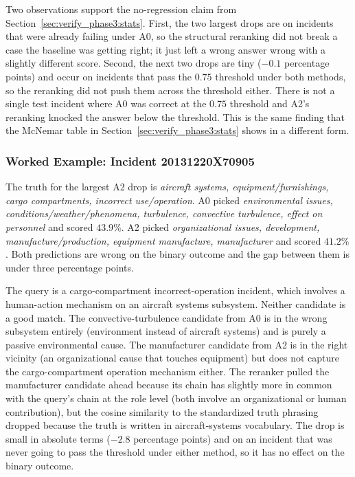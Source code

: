\documentclass[11pt]{article}
\begin{document}
Two observations support the no-regression claim from Section~\ref{sec:verify_phase3:stats}. First, the two largest drops are on incidents that were already failing under A0, so the structural reranking did not break a case the baseline was getting right; it just left a wrong answer wrong with a slightly different score. Second, the next two drops are tiny ($-0.1$ percentage points) and occur on incidents that pass the $0.75$ threshold under both methods, so the reranking did not push them across the threshold either. There is not a single test incident where A0 was correct at the $0.75$ threshold and A2's reranking knocked the answer below the threshold. This is the same finding that the McNemar table in Section~\ref{sec:verify_phase3:stats} shows in a different form.

\subsubsection{Worked Example: Incident 20131220X70905}
\label{sec:verify_phase3:losses:largest}

The truth for the largest A2 drop is \emph{aircraft systems, equipment/furnishings, cargo compartments, incorrect use/operation}. A0 picked \emph{environmental issues, conditions/weather/phenomena, turbulence, convective turbulence, effect on personnel} and scored $43.9\%$. A2 picked \emph{organizational issues, development, manufacture/production, equipment manufacture, manufacturer} and scored $41.2\%$. Both predictions are wrong on the binary outcome and the gap between them is under three percentage points.

The query is a cargo-compartment incorrect-operation incident, which involves a human-action mechanism on an aircraft systems subsystem. Neither candidate is a good match. The convective-turbulence candidate from A0 is in the wrong subsystem entirely (environment instead of aircraft systems) and is purely a passive environmental cause. The manufacturer candidate from A2 is in the right vicinity (an organizational cause that touches equipment) but does not capture the cargo-compartment operation mechanism either. The reranker pulled the manufacturer candidate ahead because its chain has slightly more in common with the query's chain at the role level (both involve an organizational or human contribution), but the cosine similarity to the standardized truth phrasing dropped because the truth is written in aircraft-systems vocabulary. The drop is small in absolute terms ($-2.8$ percentage points) and on an incident that was never going to pass the threshold under either method, so it has no effect on the binary outcome.
\end{document}
